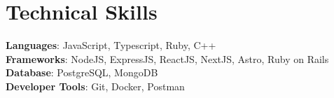 
\section{{\textcolor{mainHeading}{Technical Skills}}}
 \begin{itemize}[leftmargin=0.15in, label={}]
    \small{\item{
    
     \textbf{Languages}{: JavaScript, Typescript, Ruby, C++} \\

     \textbf{Frameworks}{: NodeJS, ExpressJS, ReactJS, NextJS, Astro, Ruby on Rails} \\
     
     \textbf{Database}{: PostgreSQL, MongoDB} \\
     
     \textbf{Developer Tools}{: Git, Docker, Postman} \\
     
    }}
 \end{itemize}